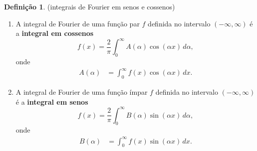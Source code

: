 \documentclass[12pt]{article}
\theoremstyle{plain}
\theoremstyle{definition}
\newtheorem{defn}{Definição}[section]
\theoremstyle{remark}
\begin{document}
\begin{defn} (integrais de Fourier em senos e cossenos)
    \begin{enumerate}
        \item[(i)] A integral de Fourier de uma função par \(f\) definida no intervalo \(\left(-\infty, \infty\right)\) é a \textbf{integral em cossenos}
        \begin{equation}
            f(x) = \frac{2}{\pi} \int_{0}^{\infty} A(\alpha) \cos(\alpha x) \, d\alpha,
        \end{equation}
        \noindent onde
        \begin{align}
            A(\alpha) &= \int_{0}^{\infty} f(x) \cos(\alpha x) \, dx.
        \end{align}
        \item[(ii)] A integral de Fourier de uma função ímpar \(f\) definida no intervalo \(\left(-\infty, \infty\right)\) é a \textbf{integral em senos}
        \begin{equation}
            f(x) = \frac{2}{\pi} \int_{0}^{\infty} B(\alpha) \sin(\alpha x) \, d\alpha,
        \end{equation}
        \noindent onde
        \begin{align}
            B(\alpha) &= \int_{0}^{\infty} f(x) \sin(\alpha x) \, dx.
        \end{align}
    \end{enumerate}
\end{defn}
\end{document}
